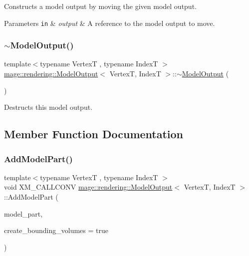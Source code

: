 Constructs a model output by moving the given model output.


\begin{DoxyParams}[1]{Parameters}
\mbox{\tt in}  & {\em output} & A reference to the model output to move. \\
\hline
\end{DoxyParams}
\mbox{\label{structmage_1_1rendering_1_1_model_output_a627e604ee86986e4d439244ff734c69c}} 
\subsubsection{\texorpdfstring{$\sim$\+Model\+Output()}{~ModelOutput()}}
{\footnotesize\ttfamily template$<$typename VertexT , typename IndexT $>$ \\
\mbox{\hyperlink{structmage_1_1rendering_1_1_model_output}{mage\+::rendering\+::\+Model\+Output}}$<$ VertexT, IndexT $>$\+::$\sim$\mbox{\hyperlink{structmage_1_1rendering_1_1_model_output}{Model\+Output}} (\begin{DoxyParamCaption}{ }\end{DoxyParamCaption})\hspace{0.3cm}{\ttfamily [default]}}

Destructs this model output. 

\subsection{Member Function Documentation}
\mbox{\label{structmage_1_1rendering_1_1_model_output_a33512b10fe669c18051a4eac3444f962}} 
\subsubsection{\texorpdfstring{Add\+Model\+Part()}{AddModelPart()}}
{\footnotesize\ttfamily template$<$typename VertexT , typename IndexT $>$ \\
void X\+M\+\_\+\+C\+A\+L\+L\+C\+O\+NV \mbox{\hyperlink{structmage_1_1rendering_1_1_model_output}{mage\+::rendering\+::\+Model\+Output}}$<$ VertexT, IndexT $>$\+::Add\+Model\+Part (\begin{DoxyParamCaption}\item[{\mbox{\hyperlink{structmage_1_1rendering_1_1_model_part}{Model\+Part}}}]{model\+\_\+part,  }\item[{bool}]{create\+\_\+bounding\+\_\+volumes = {\ttfamily true} }\end{DoxyParamCaption})}


